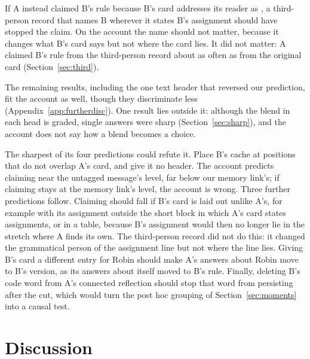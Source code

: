 If A instead claimed B's rule because B's card addresses its reader as
, a third-person record that names B wherever it states B's
assignment should have stopped the claim. On the account the name should
not matter, because it changes what B's card says but not where the card
lies. It did not matter: A claimed B's rule from the third-person record
about as often as from the original card (Section~\ref{sec:third}).

The remaining results, including the one text header that reversed our
prediction, fit the account as well, though they discriminate less
(Appendix~\ref{app:furtherdisc}). One result lies outside it: although
the blend in each head is graded, single answers were sharp
(Section~\ref{sec:sharp}), and the account does not say how a blend
becomes a choice.

The sharpest of its four predictions could refute it.
Place B's cache at positions that do not overlap A's card,
and give it no header. The account predicts claiming near the untagged
message's level, far below our memory link's; if claiming stays at the
memory link's level, the account is wrong. Three further predictions
follow. Claiming should fall if B's card is laid out unlike A's, for
example with its assignment outside the short block in which A's card
states assignments, or in a table, because B's assignment would then
no longer lie in the stretch where A finds its own. The
third-person record did not do this: it changed the grammatical person
of the assignment line but not where the line lies. Giving B's card a different
entry for Robin should make A's answers about Robin move to B's version,
as its answers about itself moved to B's rule. Finally, deleting B's
code word from A's connected reflection should stop that word from
persisting after the cut, which would turn the post hoc grouping of
Section~\ref{sec:moments} into a causal test.

\section{Discussion}
\label{sec:discussion}

